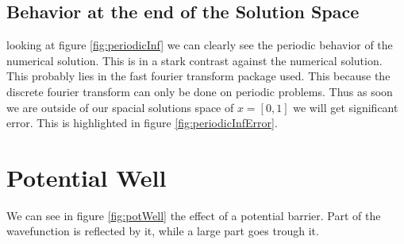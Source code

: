 \documentclass[11pt]{article}
\newlength\figureheight
\newlength\figurewidth
\newif\iftikz
\begin{document}
\subsection{Behavior at the end of the Solution Space}
looking at figure \ref{fig:periodicInf} we can clearly see the periodic behavior of the numerical solution. This is in a stark contrast against the numerical solution. This probably lies in the fast fourier transform package used. This because the discrete fourier transform can only be done on periodic problems. Thus as soon we are outside of our spacial solutions space of $x=[0,1]$ we will get significant error. This is highlighted in figure \ref{fig:periodicInfError}.
\iftikz
\begin{figure}[H]
	\centering
	\begin{subfigure}{.9\linewidth}
		\setlength\figureheight{.5\linewidth} 
		\setlength\figurewidth{.9\linewidth}
		
		\caption{The numerical solution ($\psi_n$) plotted against the analytical solution ($\psi_a$).}
		\label{fig:periodicInfPlot}
	\end{subfigure}
	\begin{subfigure}{.9\linewidth}
		\setlength\figureheight{.5\linewidth} 
		\setlength\figurewidth{.9\linewidth}
		
		\caption{The error is defined as the difference between the analytical solution and numerical solution.}
		\label{fig:periodicInfError}
	\end{subfigure}
	\label{fig:smallError}
	\caption{The numerical and analytical solution as it passes its solution space of $x=[0,1]$. One can clearly see in figure \ref{fig:periodicInfPlot} that the numerical solution is periodic. The error caused by this is highlighted in figure \ref{fig:periodicInfError}}
\end{figure}
\fi
\section{Potential Well}
We can see in figure \ref{fig:potWell} the effect of a potential barrier. Part of the wavefunction is reflected by it, while a large part goes trough it.
\iftikz
\begin{figure}[H]
	\centering
	\begin{subfigure}{.9\linewidth}
		\setlength\figureheight{.5\linewidth} 
		\setlength\figurewidth{.9\linewidth}
		
		\caption{The numerical solution of $|\psi_n(x,t)|^2$ after it has hit the potential well.}
		\label{fig:potWellfPlot}
	\end{subfigure}
	\begin{subfigure}{.9\linewidth}
		\setlength\figureheight{.5\linewidth} 
		\setlength\figurewidth{.9\linewidth}
		
		\caption{Here we clearly see the transmission and reflection before and after the wave function hits the potential well.}
		\label{fig:potWellTR}
	\end{subfigure}
	\label{fig:potWell}
	\caption{Here we depict the effect of the wave function hitting the potential well.}
\end{figure}
\fi
\end{document}
